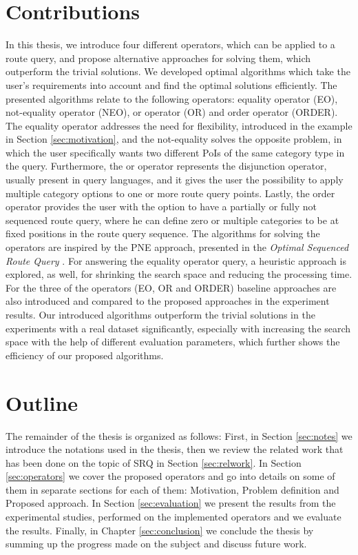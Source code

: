 \section{Contributions}
In this thesis, we introduce four different operators, which can be applied to a route query, and propose alternative approaches for solving them, which outperform the trivial solutions. We developed optimal algorithms which take the user's requirements into account and find the optimal solutions efficiently. The presented algorithms relate to the following operators: equality operator (EO), not-equality operator (NEO), or operator (OR) and order operator (ORDER). The equality operator addresses the need for flexibility, introduced in the example in Section \ref{sec:motivation}, and the not-equality solves the opposite problem, in which the user specifically wants two different PoIs of the same category type in the query. Furthermore, the or operator represents the disjunction operator, usually present in query languages, and it gives the user the possibility to apply multiple category options to one or more route query points. Lastly, the order operator provides the user with the option to have a partially or fully not sequenced route query, where he can define zero or multiple categories to be at fixed positions in the route query sequence. \newline
The algorithms for solving the operators are inspired by the PNE approach, presented in the \textit{Optimal Sequenced Route Query} \cite{OSR}. For answering the equality operator query, a heuristic approach is explored, as well, for shrinking the search space and reducing the processing time. For the three of the operators (EO, OR and ORDER) baseline approaches are also introduced and compared to the proposed approaches in the experiment results. Our introduced algorithms outperform the trivial solutions in the experiments with a real dataset significantly, especially with increasing the search space with the help of different evaluation parameters, which further shows the efficiency of our proposed algorithms.

\section{Outline}
The remainder of the thesis is organized as follows: First, in Section \ref{sec:notes} we introduce the notations used in the thesis, then we review the related work that has been done on the topic of SRQ in Section \ref{sec:relwork}. In Section \ref{sec:operators} we cover the proposed operators and go into details on some of them in separate sections for each of them: Motivation, Problem definition and Proposed approach. In Section \ref{sec:evaluation} we present the results from the experimental studies, performed on the implemented operators and we evaluate the results. Finally, in Chapter \ref{sec:conclusion} we conclude the thesis by summing up the progress made on the subject and discuss future work.
